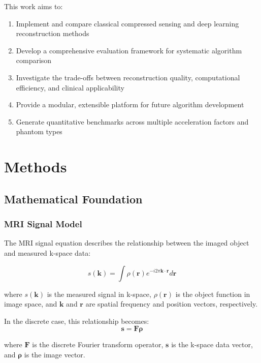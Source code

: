 \documentclass[11pt,a4paper]{article}
\begin{document}
This work aims to:
\begin{enumerate}
    \item Implement and compare classical compressed sensing and deep learning reconstruction methods
    \item Develop a comprehensive evaluation framework for systematic algorithm comparison
    \item Investigate the trade-offs between reconstruction quality, computational efficiency, and clinical applicability
    \item Provide a modular, extensible platform for future algorithm development
    \item Generate quantitative benchmarks across multiple acceleration factors and phantom types
\end{enumerate}

\section{Methods}

\subsection{Mathematical Foundation}

\subsubsection{MRI Signal Model}

The MRI signal equation describes the relationship between the imaged object and measured k-space data:

\begin{equation}
s(\mathbf{k}) = \int \rho(\mathbf{r}) e^{-i 2\pi \mathbf{k} \cdot \mathbf{r}} d\mathbf{r}
\end{equation}

where $s(\mathbf{k})$ is the measured signal in k-space, $\rho(\mathbf{r})$ is the object function in image space, and $\mathbf{k}$ and $\mathbf{r}$ are spatial frequency and position vectors, respectively.

In the discrete case, this relationship becomes:
\begin{equation}
\mathbf{s} = \mathbf{F} \boldsymbol{\rho}
\end{equation}

where $\mathbf{F}$ is the discrete Fourier transform operator, $\mathbf{s}$ is the k-space data vector, and $\boldsymbol{\rho}$ is the image vector.
\end{document}
